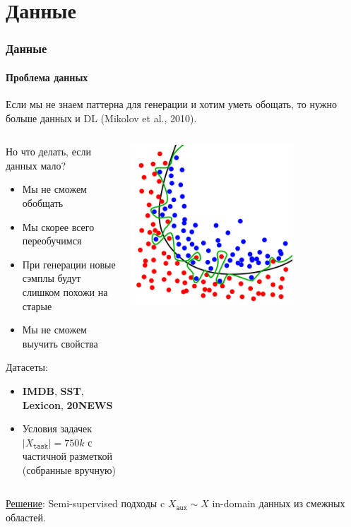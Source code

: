 \documentclass[10pt]{beamer}
\begin{document}
\section{Данные}
\begin{frame}
\frametitle{Данные}
\framesubtitle{Проблема данных}

Если мы не знаем паттерна для генерации и хотим уметь обощать, то нужно больше данных и DL (Mikolov et al., 2010). \\

\begin{columns}
    \begin{column}{0.5\textwidth}
        \vskip2mm
        Но что делать, если данных мало?
        \begin{itemize}
            \item Мы не сможем обобщать 
            \item Мы скорее всего переобучимся
            \item При генерации новые сэмплы будут слишком похожи на старые
            \item Мы не сможем выучить свойства
        \end{itemize}
        Датасеты:
        \begin{itemize}
            \item \textbf{IMDB}, \textbf{SST}, \textbf{Lexicon}, \textbf{20NEWS}
            \item Условия задачек $|X_{\texttt{task}}| = 750k$ с частичной разметкой (собранные вручную)
        \end{itemize}
    \end{column}
    \begin{column}{0.5\textwidth}
        \begin{center}
            \includegraphics[width=0.7\textwidth]{images/overfitting.png}
        \end{center}
    \end{column}
\end{columns}

\underline{Решение}: Semi-supervised подходы c $X_{\texttt{aux}} \sim X$ in-domain данных из смежных областей.

\end{frame}
\end{document}
